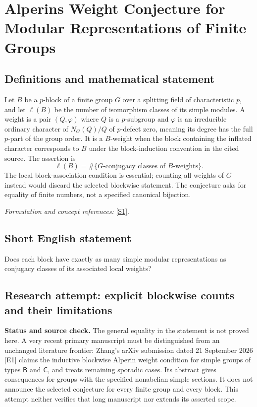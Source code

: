 \documentclass[11pt]{article}
\begin{document}
\section*{\texorpdfstring{Alperins Weight Conjecture for Modular Representations of Finite Groups}{Alperins Weight Conjecture for Modular Representations of Finite Groups}}\label{342}
\subsection{Definitions and mathematical statement}
Let $B$ be a $p$-block of a finite group $G$ over a splitting field of characteristic $p$, and let $\ell(B)$ be the number of isomorphism classes of its simple modules. A weight is a pair $(Q,\varphi)$ where $Q$ is a $p$-subgroup and $\varphi$ is an irreducible ordinary character of $N_G(Q)/Q$ of $p$-defect zero, meaning its degree has the full $p$-part of the group order. It is a $B$-weight when the block containing the inflated character corresponds to $B$ under the block-induction convention in the cited source. The assertion is
\[
 \ell(B)=\#\{G\text{-conjugacy classes of }B\text{-weights}\}.
\]
The local block-association condition is essential; counting all weights of $G$ instead would discard the selected blockwise statement. The conjecture asks for equality of finite numbers, not a specified canonical bijection.
\par\smallskip\textit{Formulation and concept references:} \href{https://par.nsf.gov/servlets/purl/10275354}{[S1]}.

\subsection{Short English statement}
Does each block have exactly as many simple modular representations as conjugacy classes of its associated local weights?
\subsection{Research attempt: explicit blockwise counts and their limitations}
\textbf{Status and source check.} The general equality in the statement is not proved here. A very recent primary manuscript must be distinguished from an unchanged literature frontier: Zhang's arXiv submission dated 21 September 2026 [E1] claims the inductive blockwise Alperin weight condition for simple groups of types $\mathsf B$ and $\mathsf C$, and treats remaining sporadic cases. Its abstract gives consequences for groups with the specified nonabelian simple sections. It does not announce the selected conjecture for every finite group and every block. This attempt neither verifies that long manuscript nor extends its asserted scope.
\end{document}
